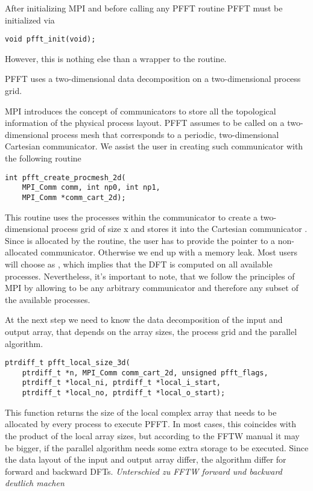 After initializing MPI and before calling any PFFT routine PFFT must be initialized via
\begin{lstlisting}
void pfft_init(void);
\end{lstlisting}
However, this is nothing else than a wrapper to the  routine.

PFFT uses a two-dimensional data decomposition on a two-dimensional process grid.

MPI introduces the concept of communicators
to store all the topological information of the physical process layout. PFFT assumes to be called
on a two-dimensional process mesh that corresponds to a periodic, two-dimensional Cartesian
communicator. We assist the user in creating such communicator with the following routine
\begin{lstlisting}
int pfft_create_procmesh_2d(
    MPI_Comm comm, int np0, int np1,
    MPI_Comm *comm_cart_2d);
\end{lstlisting}
This routine uses the processes within the communicator  to create a two-dimensional process
grid of size  x  and stores it into the Cartesian communicator
. Since  is allocated by the routine, the user has to provide
the pointer to a non-allocated communicator. Otherwise we end up with a memory leak.
Most users will choose  as , which implies that the DFT is computed
on all available processes. Nevertheless, it's important to note, that we follow the principles of MPI
by allowing  to be any arbitrary communicator and therefore any subset of the available processes.

At the next step we need to know the data decomposition of the input and output array, that depends on
the array sizes, the process grid and the parallel algorithm.
\begin{lstlisting}
ptrdiff_t pfft_local_size_3d(
    ptrdiff_t *n, MPI_Comm comm_cart_2d, unsigned pfft_flags,
    ptrdiff_t *local_ni, ptrdiff_t *local_i_start,
    ptrdiff_t *local_no, ptrdiff_t *local_o_start);
\end{lstlisting}
This function returns the size of the local complex array that needs to be allocated by every process to
execute PFFT. In most cases, this coincides with the product of the local array sizes, but according to the FFTW
manual it may be bigger, if the parallel algorithm needs some extra storage to be executed.
Since the data layout of the input and output array differ, the algorithm differ for forward and backward
DFTs. \emph{Unterschied zu FFTW forward und backward deutlich machen}

